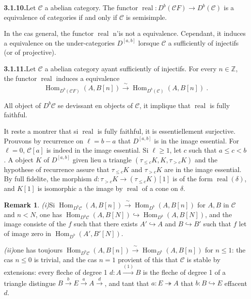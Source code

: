 \documentclass[12pt,a4paper]{article}
\theoremstyle{plain}
\theoremstyle{definition}
\newtheorem{remark}[theorem]{Remark}
\DeclareMathOperator{\Hom}{Hom}
\DeclareMathOperator{\real}{real}
\begin{document}
\smallskip
\noindent\textbf{3.1.10.}\quad Let $\mathcal{C}$ a abelian category. The functor $\real : D^b(\mathcal{C}F) \to D^b(\mathcal{C})$ is a equivalence of categories if and only if $\mathcal{C}$ is semisimple.

In the cas general, the functor $\real$ n'is not a equivalence. Cependant, it induces a equivalence on the under-categories $D^{[a,b]}$ lorsque $\mathcal{C}$ a sufficiently of injectifs (or of projective).

\smallskip
\noindent\textbf{3.1.11.}\quad Let $\mathcal{C}$ a abelian category ayant sufficiently of injectifs. For every $n \in \mathbb{Z}$, the functor $\real$ induces a equivalence
\[
\Hom_{D^b(\mathcal{C}F)}(A, B[n]) \xrightarrow{\;\sim\;} \Hom_{D^b(\mathcal{C})}(A, B[n])\;.
\]

All object of $D^b\mathcal{C}$ se devissant en objects of $\mathcal{C}$, it implique that $\real$ is fully faithful.

It reste a montrer that si $\real$ is fully faithful, it is essentiellement surjective. Prouvons by recurrence on $\ell = b-a$ that $D^{[a,b]}$ is in the image essential. For $\ell = 0$, $\mathcal{C}[a]$ is indeed in the image essential. Si $\ell \geqslant 1$, let $c$ such that $a \leqslant c < b$. A object $K$ of $D^{[a,b]}$ given lieu a triangle $(\tau_{\leqslant c} K, K, \tau_{> c} K)$ and the hypothese of recurrence assure that $\tau_{\leqslant c} K$ and $\tau_{> c} K$ are in the image essential. By full fidelite, the morphism $d : \tau_{> c} K \to (\tau_{\leqslant c} K)[1]$ is of the form $\real(\delta)$, and $K[1]$ is isomorphic a the image by $\real$ of a cone on $\delta$.

\begin{remark}\label{rem:3.1.12}
\emph{(i)}\quad Si $\Hom_{D^b\mathcal{C}}(A, B[n]) \xrightarrow{\;\sim\;} \Hom_{D^b}(A, B[n])$ for $A, B$ in $\mathcal{C}$ and $n < N$, one has $\Hom_{D^b\mathcal{C}}(A, B[N]) \hookrightarrow \Hom_{D^b}(A, B[N])$, and the image consiste of the $f$ such that there exists $A' \hookrightarrow A$ and $B \hookrightarrow B'$ such that $f$ let of image zero in $\Hom_{D^b}(A', B'[N])$.

\emph{(ii)}\quad one has toujours $\Hom_{D^b\mathcal{C}}(A, B[n]) \xrightarrow{\;\sim\;} \Hom_{D^b}(A, B[n])$ for $n \leqslant 1$: the cas $n \leqslant 0$ is trivial, and the cas $n = 1$ provient of this that $\mathcal{C}$ is stable by extensions: every fleche of degree 1 $d : A \xrightarrow{(1)} B$ is the fleche of degree 1 of a triangle distingue $B \xrightarrow{b} E \xrightarrow{a} A \xrightarrow{d}$, and tant that $a : E \twoheadrightarrow A$ that $b : B \hookrightarrow E$ effacent $d$.
\end{remark}
\end{document}

